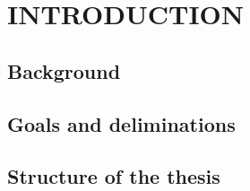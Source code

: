 \section{INTRODUCTION}


\subsection{Background}


\subsection{Goals and deliminations}


\subsection{Structure of the thesis}

%
\begin{comment}
FINAL THESIS INSTRUCTIONS.

The actual research report is opened with an introduction. The purpose of the introduction is to
introduce the topic and awaken the reader's interest. The introduction briefly describes the
background, material extent and aims of the thesis. The introduction relates the thesis to other
research and sources and presents the research methodology applied. It also describes the key
points and organisation of the research report. It does not, however, include detailed descriptions 
of the theory, methods or results. A good introduction is, nevertheless, significantly longer than a
couple of pages, and is organised in a logical manner.
\end{comment}